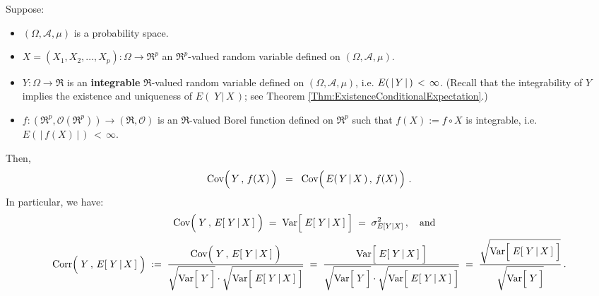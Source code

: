 \begin{proposition}
\label{Propn:CovarianceYFX}
\mbox{}
\vskip 0.2cm
\noindent
Suppose:
\begin{itemize}
\item
	$(\Omega,\mathcal{A},\mu)$ is a probability space.
\item
	$X = (X_{1}, X_{2}, \ldots, X_{p}) : \Omega \longrightarrow \Re^{p}$ an $\Re^{p}$-valued random variable
	defined on $(\Omega,\mathcal{A},\mu)$.
\item
	$Y : \Omega \longrightarrow \Re$ is an \textbf{\color{red}integrable} $\Re$-valued random variable
	defined on $(\Omega,\mathcal{A},\mu)$,
	i.e. $E(\,\vert\,\overset{{\color{white}.}}{Y}\,\vert\,)\,<\,\infty$.
	\vskip 0.01cm
	(Recall that the integrability of $Y$ implies the existence and uniqueness of $E\!\left(\;Y\,\vert\,X\,\right)$;
	see Theorem \ref{Thm:ExistenceConditionalExpectation}.)
\item
	$f : (\Re^{p},\mathcal{O}(\Re^{p})) \longrightarrow (\Re,\mathcal{O})$ is an $\Re$-valued Borel function
	defined on $\Re^{p}$ such that $f(X) := f\circ X$ is integrable, i.e. $E\!\left(\,\vert\,f(X)\,\vert\,\right) \,<\, \infty$.
\end{itemize}
Then,
\begin{equation*}
\Cov\!\left(\,\overset{{\color{white}.}}{Y}\,,\,f(X)\,\right)
\;\; = \;\;
\Cov\!\left(\,\overset{{\color{white}.}}{E}(\,Y\,\vert\,X\,)\,,\,f(X)\,\right)\,.
\end{equation*}
In particular, we have:
\begin{equation*}
\Cov\!\left(\;\overset{{\color{white}.}}{Y}\,,\,E[\;Y\,\vert\,X\,]\;\right)
	\; = \; \Var\!\left[\;\overset{{\color{white}.}}{E}[\;Y\,\vert\,X\,]\;\right]
	\; = \; \sigma^{2}_{E[Y\vert X]}\,,
\quad\textnormal{and}\quad
\end{equation*}
\begin{equation*}
\Corr\!\left(\;\overset{{\color{white}.}}{Y}\,,\,E[\;Y\,\vert\,X\,]\;\right)
	\; := \;
		\dfrac{
			\Cov\!\left(\;\overset{{\color{white}.}}{Y}\,,\,E[\;Y\,\vert\,X\,]\;\right)
			}{
			\sqrt{\Var\!\left[\;\overset{{\color{white}.}}{Y}\,\right]} \cdot \sqrt{\Var\!\left[\;\overset{{\color{white}.}}{E}[\;Y\,\vert\,X\,]\;\right]}
			}
	\; = \;
		\dfrac{
			\Var\!\left[\;\overset{{\color{white}.}}{E}[\;Y\,\vert\,X\,]\;\right]
			}{
			\sqrt{\Var\!\left[\;\overset{{\color{white}.}}{Y}\,\right]} \cdot \sqrt{\Var\!\left[\;\overset{{\color{white}.}}{E}[\;Y\,\vert\,X\,]\;\right]}
			}
	\; = \;
		\dfrac{
			\sqrt{\Var\!\left[\;\overset{{\color{white}.}}{E}[\;Y\,\vert\,X\,]\;\right]}
			}{
			\sqrt{\Var\!\left[\;\overset{{\color{white}.}}{Y}\,\right]}
			}\,.
\end{equation*}
\end{proposition}
